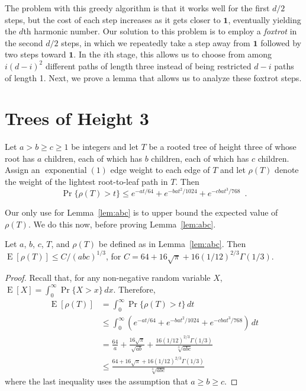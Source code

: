 \documentclass[a4paper,UKenglish]{lipics-v2016}
\DeclareMathOperator{\E}{E}
\DeclareMathOperator{\exponential}{exponential}
\newcommand{\one}{\mathbf{1}}
\begin{document}
The problem with this greedy algorithm is that it works well for the
first $d/2$ steps, but the cost of each step increases as it gets closer
to $\one$, eventually yielding the $d$th harmonic number.  Our solution
to this problem is to employ a \emph{foxtrot} in the second $d/2$ steps,
in which we repeatedly take a step away from $\one$ followed by two steps
toward $\one$.  In the $i$th stage, this allows us to choose from among
$i(d-i)^2$ different paths of length three instead of being restricted
$d-i$ paths of length 1. Next, we prove a lemma that allows us to analyze these foxtrot steps.


\section{Trees of Height 3}

\begin{lemma}\label{lem:abc}
Let $a>b\ge c\ge 1$ be integers and let $T$ be a rooted tree of height
three of whose root has $a$ children, each of which has $b$ children,
each of which has $c$ children.  Assign an $\exponential(1)$ edge weight
to each edge of $T$ and let $\rho(T)$ denote the weight of the lightest
root-to-leaf path in $T$.  Then
\[
    \Pr\{\rho(T) > t\} \le e^{-at/64} + e^{-bat^2/1024} + e^{-cbat^3/768} \enspace .
\] 
\end{lemma}

Our only use for Lemma~\ref{lem:abc} is to upper bound the expected
value of $\rho(T)$.  We do this now, before proving
Lemma~\ref{lem:abc}.

\begin{corollary}\label{cor:expectation}
  Let $a$, $b$, $c$, $T$, and $\rho(T)$ be defined as in Lemma~\ref{lem:abc}.  Then $\E[\rho(T)] \le C/(abc)^{1/3}$, for
  $C=64 + 16\sqrt{\pi} + 16(1/12)^{2/3}\Gamma(1/3)$.
\end{corollary}

\begin{proof}
   Recall that, for any non-negative random variable $X$, $\E[X]=\int_0^{\infty} \Pr\{X>x\}\,dx$.  Therefore,
  \begin{align*}
    \E[\rho(T)] & = \int_0^{\infty} \Pr\{\rho(T)>t\}\,dt \\
                & \le \int_0^{\infty}\left( e^{-at/64} + e^{-bat^2/1024} + e^{-cbat^3/768}\right)\,dt \\
                & = \frac{64}{a} + \frac{16\sqrt{\pi}}{\sqrt{ab}} + \frac{16(1/12)^{2/3}\Gamma(1/3)}{\sqrt[3]{abc}} \\
                & \le \frac{64 + 16\sqrt{\pi} + 16(1/12)^{2/3}\Gamma(1/3)}{\sqrt[3]{abc}}
  \end{align*}
  where the last inequality uses the assumption that $a\ge b\ge c$.
\end{proof}
\end{document}
